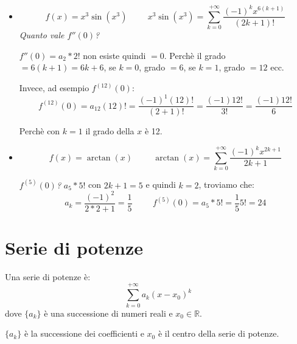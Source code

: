 \begin{example}
\begin{itemize}
\begin{osservation*}
        \end{osservation*}
        
        \item \begin{equation*}f(x)=x^3\sin(x^3)\hspace{1cm}x^3\sin(x^3)=\sum^{+\infty}_{k=0}\frac{(-1)^kx^{6(k+1)}}{(2k+1)!}\end{equation*}
        \textit{Quanto vale $f''(0)$?}
        
        $f''(0)=a_2*2!$ non esiste quindi $=0$. Perchè il grado $=6(k+1)=6k+6$, se $k=0$, grado $=6$, se $k=1$, grado $=12$ ecc.
        
        Invece, ad esempio $f^{(12)}(0)$:
        \begin{equation*}
            f^{(12)}(0)=a_{12}(12)!=\frac{(-1)^1(12)!}{(2+1)!}=\frac{(-1)12!}{3!}=\frac{(-1)12!}{6}
        \end{equation*}
        
        Perchè con $k=1$ il grado della $x$ è 12.
        
        \item \begin{equation*}f(x)=\arctan(x)\hspace{1cm}\arctan(x)=\sum^{+\infty}_{k=0}\frac{(-1)^kx^{2k+1}}{2k+1}\end{equation*}
        
        \textit{$f^{(5)}(0)$?} $a_5*5!$ con $2k+1=5$ e quindi $k=2$, troviamo che:
        \begin{equation*}
            a_k=\frac{(-1)^2}{2*2+1}=\frac{1}{5}\hspace{1cm}f^{(5)}(0)=a_5*5!=\frac{1}{5}5!=24
        \end{equation*}
        
    \end{itemize}
\end{example}


\chapter{Serie di potenze}
Una serie di potenze è: 
\begin{equation*}
    \sum^{+\infty}_{k=0}a_k(x-x_0)^k    
\end{equation*}
dove $\{a_k\}$ è una successione di numeri reali e $x_0\in\mathbb{R}$.
\begin{definition*}
    $\{a_k\}$ è la successione dei coefficienti e $x_0$ è il centro della serie di potenze.
\end{definition*}

